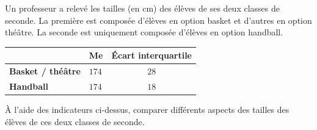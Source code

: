 \begin{exo}
	Un professeur a relevé les tailles (en cm) des élèves de ses deux classes de seconde. La première est composée d'élèves en option basket et d'autres en option théâtre. La seconde est uniquement composée d'élèves en option handball.
	\begin{center}
		\footnotesize
		\def\arraystretch{1.5}
		\begin{tabular}{|l|C{1cm}|c|}\hline
			                          & \textbf{Me} & \textbf{Écart interquartile} \\ \hline
			\textbf{Basket / théâtre} & $174$       & $28$                         \\ \hline
			\textbf{Handball}         & $174$       & $18$                         \\ \hline
		\end{tabular}
	\end{center}

	À l'aide des indicateurs ci-dessus, comparer différents aspects des tailles des élèves de ces deux classes de seconde.
\end{exo}
